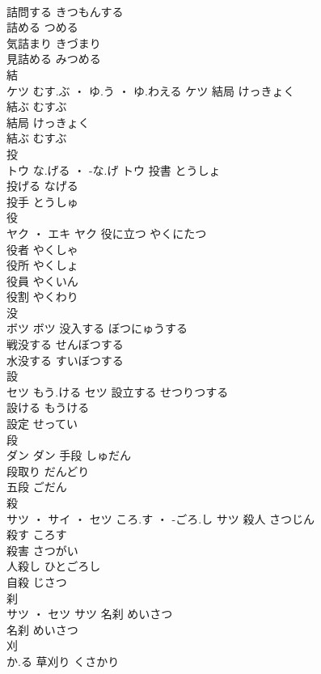 \documentclass[8pt]{extreport}
\begin{document}
\begin{CJK}{UTF8}{min}
\\	詰問する	きつもんする	
\\	詰める	つめる	
\\	気詰まり	きづまり	
\\	見詰める	みつめる	
\\	結	
\\	ケツ	むす.ぶ ・ ゆ.う ・ ゆ.わえる	ケツ	結局	けっきょく	
\\	結ぶ	むすぶ	
\\	結局	けっきょく	
\\	結ぶ	むすぶ	
\\	投	
\\	トウ	な.げる ・ -な.げ	トウ	投書	とうしょ	
\\	投げる	なげる	
\\	投手	とうしゅ	
\\	役	
\\	ヤク ・ エキ		ヤク	役に立つ	やくにたつ	
\\	役者	やくしゃ	
\\	役所	やくしょ	
\\	役員	やくいん	
\\	役割	やくわり	
\\	没	
\\	ボツ		ボツ	没入する	ぼつにゅうする	
\\	戦没する	せんぼつする	
\\	水没する	すいぼつする	
\\	設	
\\	セツ	もう.ける	セツ	設立する	せつりつする	
\\	設ける	もうける	
\\	設定	せってい	
\\	段	
\\	ダン		ダン	手段	しゅだん	
\\	段取り	だんどり	
\\	五段	ごだん	
\\	殺	
\\	サツ ・ サイ ・ セツ	ころ.す ・ -ごろ.し	サツ	殺人	さつじん	
\\	殺す	ころす	
\\	殺害	さつがい	
\\	人殺し	ひとごろし	
\\	自殺	じさつ	
\\	刹	
\\	サツ ・ セツ		サツ	名刹	めいさつ	
\\	名刹	めいさつ	
\\	刈	
\\	か.る														草刈り	くさかり	

\end{CJK}
\end{document}
